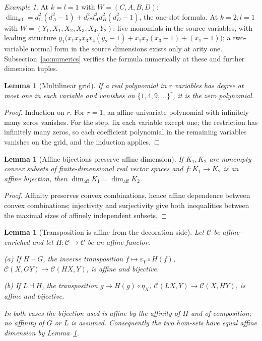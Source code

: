 \documentclass[11pt,a4paper]{article}
\theoremstyle{definition}
\theoremstyle{plain}
\newtheorem{lemma}[theorem]{Lemma}
\theoremstyle{remark}
\newtheorem{example}[theorem]{Example}
\newcommand{\affdim}{\dim_{\mathrm{aff}}}
\begin{document}
\begin{example}
At $k=l=1$ with $W=(C,A,B,D)$:
$\affdim=d_C^2(d_A^2-1)+d_C^2d_A^2d_B^2(d_D^2-1)$, the one-slot formula.
At $k=2,l=1$ with $W=(Y_1,X_1,X_2,X_3,X_4,Y_2)$: five monomials in the
source variables, with leading structure
$y_1\bigl(x_1x_2x_3x_4(y_2-1)+x_1x_2(x_3-1)+(x_1-1)\bigr)$; a two-variable
normal form in the source dimensions exists only at arity one.
Subsection~\ref{ao:numerics} verifies the formula numerically at these and
further dimension tuples.
\end{example}

\begin{lemma}[Multilinear grid]
\label{ao:grid}
If a real polynomial in $r$ variables has degree at most one in each
variable and vanishes on $\{1,4,9,\dots\}^r$, it is the zero polynomial.
\end{lemma}

\begin{proof}
Induction on $r$. For $r=1$, an affine univariate polynomial with
infinitely many zeros vanishes. For the step, fix each variable except one;
the restriction has infinitely many zeros, so each coefficient polynomial
in the remaining variables vanishes on the grid, and the induction applies.
\end{proof}

\begin{lemma}[Affine bijections preserve affine dimension]
\label{ao:affbij}
If $K_1,K_2$ are nonempty convex subsets of finite-dimensional real vector
spaces and $f:K_1\to K_2$ is an affine bijection, then
$\affdim K_1=\affdim K_2$.
\end{lemma}

\begin{proof}
Affinity preserves convex combinations, hence affine dependence between
convex combinations; injectivity and surjectivity give both inequalities
between the maximal sizes of affinely independent subsets.
\end{proof}

\begin{lemma}[Transposition is affine from the decoration side]
\label{ao:transp}
Let $\mathcal C$ be affine-enriched and let $H:\mathcal C\to\mathcal C$ be
an affine functor.

\emph{(a)} If $H\dashv G$, the inverse transposition
$f\mapsto \varepsilon_Y\circ H(f)$,
$\mathcal C(X,GY)\to\mathcal C(HX,Y)$, is affine and bijective.

\emph{(b)} If $L\dashv H$, the transposition
$g\mapsto H(g)\circ\eta_X$,
$\mathcal C(LX,Y)\to\mathcal C(X,HY)$, is affine and bijective.

In both cases the bijection used is affine by the affinity of $H$ and of
composition; no affinity of $G$ or $L$ is assumed. Consequently the two
hom-sets have equal affine dimension by Lemma~\ref{ao:affbij}.
\end{lemma}
\end{document}
